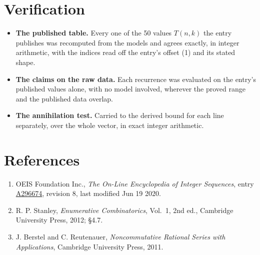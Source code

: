 \documentclass[11pt]{article}
\theoremstyle{definition}
\begin{document}
\section{Verification}

\begin{itemize}

\item {\bfseries The published table.} Every one of the 50 values $T(n,k)$ the entry publishes was recomputed from the models and agrees exactly, in integer arithmetic, with the indices read off the entry's offset (1) and its stated shape.

\item {\bfseries The claims on the raw data.} Each recurrence was evaluated on the entry's published values alone, with no model involved, wherever the proved range and the published data overlap.

\item {\bfseries The annihilation test.} Carried to the derived bound for each line separately, over the whole vector, in exact integer arithmetic.

\end{itemize}

\section{References}

\begin{enumerate}

\item OEIS Foundation Inc., \emph{The On-Line Encyclopedia of Integer Sequences}, entry \href{https://oeis.org/A296674}{A296674}, revision 8, last modified Jun 19 2020.

\item R. P. Stanley, \emph{Enumerative Combinatorics}, Vol.~1, 2nd ed., Cambridge University Press, 2012; \S4.7.

\item J. Berstel and C. Reutenauer, \emph{Noncommutative Rational Series with Applications}, Cambridge University Press, 2011.

\end{enumerate}
\end{document}
